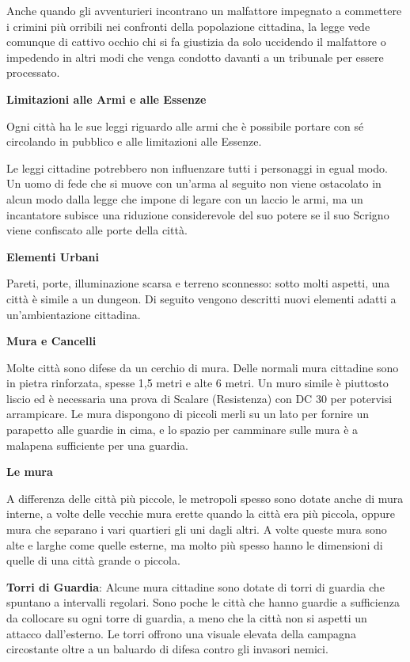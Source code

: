 \documentclass[a4paper,11pt,twoside,openany]{book}
\begin{document}
Anche quando gli avventurieri incontrano un malfattore impegnato a commettere i crimini più orribili nei confronti della popolazione cittadina, la legge vede comunque di cattivo occhio chi si fa giustizia da solo uccidendo il malfattore o impedendo in altri modi che venga condotto davanti a un tribunale per essere processato.

\textbf{Limitazioni alle Armi e alle Essenze}

Ogni città ha le sue leggi riguardo alle armi che è possibile portare con sé circolando in pubblico e alle limitazioni alle Essenze.

Le leggi cittadine potrebbero non influenzare tutti i personaggi in egual modo. Un uomo di fede che si muove con un'arma al seguito non viene ostacolato in alcun modo dalla legge che impone di legare con un laccio le armi, ma un incantatore subisce una riduzione considerevole del suo potere se il suo Scrigno viene confiscato alle porte della città.

\textbf{Elementi Urbani}

Pareti, porte, illuminazione scarsa e terreno sconnesso: sotto molti aspetti, una città è simile a un dungeon. Di seguito vengono descritti nuovi elementi adatti a un'ambientazione cittadina.

\textbf{Mura e Cancelli}

Molte città sono difese da un cerchio di mura. Delle normali mura cittadine sono in pietra rinforzata, spesse 1,5 metri e alte 6 metri. Un muro simile è piuttosto liscio ed è necessaria una prova di Scalare (Resistenza) con DC 30 per potervisi arrampicare. Le mura dispongono di piccoli merli su un lato per fornire un parapetto alle guardie in cima, e lo spazio per camminare sulle mura è a malapena sufficiente per una guardia.

\textbf{Le mura}

A differenza delle città più piccole, le metropoli spesso sono dotate anche di mura interne, a volte delle vecchie mura erette quando la città era più piccola, oppure mura che separano i vari quartieri gli uni dagli altri. A volte queste mura sono alte e larghe come quelle esterne, ma molto più spesso hanno le dimensioni di quelle di una città grande o piccola.

\textbf{Torri di Guardia}: Alcune mura cittadine sono dotate di torri di guardia che spuntano a intervalli regolari. Sono poche le città che hanno guardie a sufficienza da collocare su ogni torre di guardia, a meno che la città non si aspetti un attacco dall'esterno. Le torri offrono una visuale elevata della campagna circostante oltre a un baluardo di difesa contro gli invasori nemici.
\end{document}
